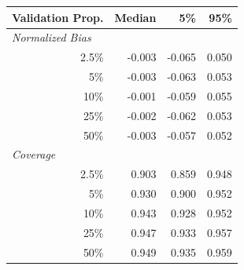 
\begin{tabular}{r|rrr}
\toprule
Validation Prop. & Median & 5\% & 95\%\\
\midrule
\multicolumn{1}{l|}{\textit{Normalized Bias}}\\
2.5\% & -0.003 & -0.065 & 0.050\\
5\% & -0.003 & -0.063 & 0.053\\
10\% & -0.001 & -0.059 & 0.055\\
25\% & -0.002 & -0.062 & 0.053\\
50\% & -0.003 & -0.057 & 0.052\\
\midrule
%
\multicolumn{1}{l|}{\textit{Coverage}}\\
2.5\% & 0.903 & 0.859 & 0.948\\
5\% & 0.930 & 0.900 & 0.952\\
10\% & 0.943 & 0.928 & 0.952\\
25\% & 0.947 & 0.933 & 0.957\\
50\% & 0.949 & 0.935 & 0.959\\
\bottomrule
\end{tabular}
